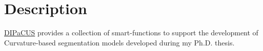 \hypertarget{index_Description}{}\section{Description}\label{index_Description}
\mbox{\hyperlink{namespaceDIPaCUS}{D\+I\+Pa\+C\+US}} provides a collection of smart-\/functions to support the development of Curvature-\/based segmentation models developed during my Ph.\+D. thesis. 